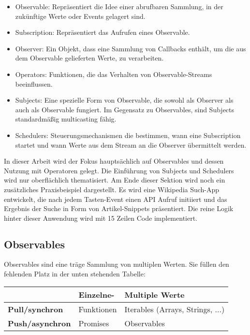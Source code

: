 \begin{itemize}
    \item Observable: Repräsentiert die Idee einer abrufbaren Sammlung, in der zukünftige Werte oder Events gelagert sind.
    \item Subscription: Repräsentiert das Aufrufen eines Observable.
    \item Observer: Ein Objekt, dass eine Sammlung von Callbacks enthält, um die aus dem Observable gelieferten Werte, zu verarbeiten.
    \item Operators: Funktionen, die das Verhalten von Observable-Streams beeinflussen.
    \item Subjects: Eine spezielle Form von Observable, die sowohl als Observer als auch als Observable fungiert. Im Gegensatz zu Observables, sind Subjects standardmäßig multicasting fähig.
    \item Schedulers: Steuerungsmechanismen die bestimmen, wann eine Subscription startet und wann Werte aus dem Stream an die Observer übermittelt werden.
\end{itemize}

\noindent
In dieser Arbeit wird der Fokus hauptsächlich auf Observables und dessen Nutzung mit Operatoren gelegt. Die Einführung von Subjects und Schedulers wird nur oberflächlich thematisiert. Am Ende dieser Sektion wird noch ein zusätzliches Praxisbeispiel dargestellt. Es wird eine Wikipedia Such-App entwickelt, die nach jedem Tasten-Event einen API Aufruf initiiert und das Ergebnis der Suche in Form von Artikel-Snippets präsentiert. Die reine Logik hinter dieser Anwendung wird mit 15 Zeilen Code implementiert.

\subsection{Observables}

Observables sind eine träge Sammlung von multiplen Werten\cite{rx-intro}. Sie füllen den fehlenden Platz in der unten stehenden Tabelle:

\begin{center}
    \begin{tabular}{| l | l | l |}
    \hline
    & \textbf{Einzelne-} & \textbf{Multiple Werte} \\ \hline
    \textbf{Pull/synchron} & Funktionen & Iterables (Arrays, Strings, ...) \\ \hline
    \textbf{Push/asynchron} & Promises & Observables  \\ \hline
    \end{tabular}
\end{center}

